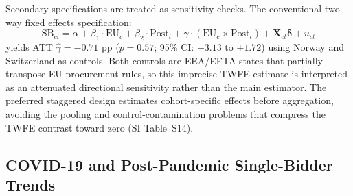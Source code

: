 \documentclass[11pt,a4paper]{article}
\begin{document}
Secondary specifications are treated as sensitivity checks. The conventional two-way fixed effects specification:
\begin{equation}
\text{SB}_{ct} = \alpha + \beta_1 \cdot \text{EU}_c + \beta_2 \cdot \text{Post}_t + \gamma \cdot (\text{EU}_c \times \text{Post}_t) + \mathbf{X}_{ct}\boldsymbol{\delta} + u_{ct}
\label{eq:did}
\end{equation}
yields ATT $\hat{\gamma} = -0.71$ pp ($p = 0.57$; 95\% CI: $-3.13$ to $+1.72$) using Norway and Switzerland as controls. Both controls are EEA/EFTA states that partially transpose EU procurement rules, so this imprecise TWFE estimate is interpreted as an attenuated directional sensitivity rather than the main estimator. The preferred staggered design estimates cohort-specific effects before aggregation, avoiding the pooling and control-contamination problems that compress the TWFE contrast toward zero (SI Table~S14).

\subsection{COVID-19 and Post-Pandemic Single-Bidder Trends}
\end{document}
